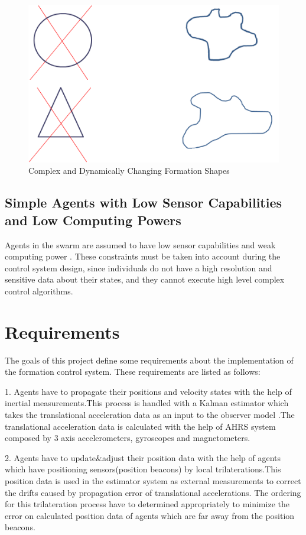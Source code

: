 \begin{figure}[H]
\caption{Complex and Dynamically Changing Formation Shapes}
\centering
\includegraphics[scale = 1]{complex}
\end{figure}

\subsection{Simple Agents with Low Sensor Capabilities and Low Computing Powers}
Agents in the swarm are assumed to have low sensor capabilities and weak computing power \cite{6}. These constraints must be taken into account during the control system design, since individuals do not have a high resolution and sensitive data about their states, and they cannot execute high level complex control algorithms.

\section{Requirements}
The goals of this project define some requirements about the implementation of the formation control system. These requirements are listed as follows:

1. Agents have to propagate their positions and velocity states with the help of inertial measurements.This process is handled with a Kalman estimator which takes the translational acceleration data as an input to the observer model .The translational acceleration data is calculated with the help of AHRS system composed by 3 axis accelerometers, gyroscopes and magnetometers. 

2. Agents have to update$\&$adjust their position data with the help of agents which have positioning sensors(position beacons) by local trilaterations.This position data is used in the estimator system as external measurements to correct the drifts caused by propagation error of translational accelerations.  The ordering for this trilateration process have to determined appropriately to minimize the error on calculated position data of agents which are far away from the position beacons.

